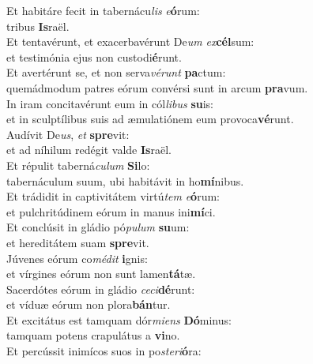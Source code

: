 \oddverse Et habitáre fecit in tabernácu\textit{lis} \textit{e}\textbf{ó}rum:~\*\\
\oddverse tribus \textbf{Is}raël.\\
\evenverse Et tentavérunt, et exacerbavérunt De\textit{um} \textit{ex}\textbf{cél}sum:~\*\\
\evenverse et testimónia ejus non custodi\textbf{é}runt.\\
\oddverse Et avertérunt se, et non serva\textit{vé}\textit{runt} \textbf{pa}ctum:~\*\\
\oddverse quemádmodum patres eórum convérsi sunt in arcum \textbf{pra}vum.\\
\evenverse In iram concitavérunt eum in cól\textit{li}\textit{bus} \textbf{su}is:~\*\\
\evenverse et in sculptílibus suis ad æmulatiónem eum provoca\textbf{vé}runt.\\
\oddverse Audívit De\textit{us}, \textit{et} \textbf{spre}vit:~\*\\
\oddverse et ad níhilum redégit valde \textbf{Is}raël.\\
\evenverse Et répulit taberná\textit{cu}\textit{lum} \textbf{Si}lo:~\*\\
\evenverse tabernáculum suum, ubi habitávit in ho\textbf{mí}nibus.\\
\oddverse Et trádidit in captivitátem virtú\textit{tem} \textit{e}\textbf{ó}rum:~\*\\
\oddverse et pulchritúdinem eórum in manus ini\textbf{mí}ci.\\
\evenverse Et conclúsit in gládio pó\textit{pu}\textit{lum} \textbf{su}um:~\*\\
\evenverse et hereditátem suam \textbf{spre}vit.\\
\oddverse Júvenes eórum co\textit{mé}\textit{dit} \textbf{i}gnis:~\*\\
\oddverse et vírgines eórum non sunt lamen\textbf{tá}tæ.\\
\evenverse Sacerdótes eórum in gládio \textit{ce}\textit{ci}\textbf{dé}runt:~\*\\
\evenverse et víduæ eórum non plora\textbf{bán}tur.\\
\oddverse Et excitátus est tamquam dór\textit{mi}\textit{ens} \textbf{Dó}minus:~\*\\
\oddverse tamquam potens crapulátus a \textbf{vi}no.\\
\evenverse Et percússit inimícos suos in po\textit{ste}\textit{ri}\textbf{ó}ra:~\*\\
